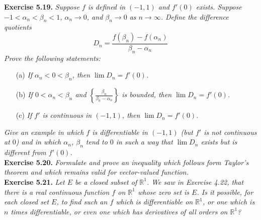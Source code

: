 \documentclass{article}
\begin{document}
\textbf{Exercise 5.19.}
\emph{Suppose $f$ is defined in $(-1,1)$ and $f'(0)$ exists.
Suppose $-1 < \alpha_n < \beta_n < 1$, $\alpha_n \rightarrow 0$,
and $\beta_n \rightarrow 0$ as $n \rightarrow \infty$.
Define the difference quotients
\[
  D_n = \frac{f(\beta_n) - f(\alpha_n)}{\beta_n - \alpha_n}
\]
Prove the following statements:}
\begin{enumerate}
  \item[(a)]
  \emph{If $\alpha_n < 0 < \beta_n$, then $\lim{D_n} = f'(0)$.}

  \item[(b)]
  \emph{If $0 < \alpha_n < \beta_n$ and $\left\{\frac{\beta_n}{\beta_n-\alpha_n}\right\}$ is bounded,
  then $\lim{D_n} = f'(0)$.}

  \item[(c)]
  \emph{If $f'$ is continuous in $(-1,1)$, then $\lim{D_n} = f'(0)$}.
\end{enumerate}
\emph{Give an example in which $f$ is differentiable in $(-1,1)$
(but $f'$ is not continuous at $0$) and in which
$\alpha_n$, $\beta_n$ tend to $0$ in such a way that $\lim{D_n}$ exists
but is different from $f'(0)$.} \\






\textbf{Exercise 5.20.}
\emph{Formulate and prove an inequality which follows form Taylor's theorem and
which remains valid for vector-valued function.} \\






\textbf{Exercise 5.21.}
\emph{Let $E$ be a closed subset of $\mathbb{R}^1$.
We saw in Exercise 4.22, that there is a real continuous function $f$ on $\mathbb{R}^1$
whose zero set is $E$.
Is it possible, for each closed set $E$,
to find such an $f$ which is differentiable on $\mathbb{R}^1$,
or one which is $n$ times differentiable,
or even one which has derivatives of all orders on $\mathbb{R}^1$?} \\



\end{document}
